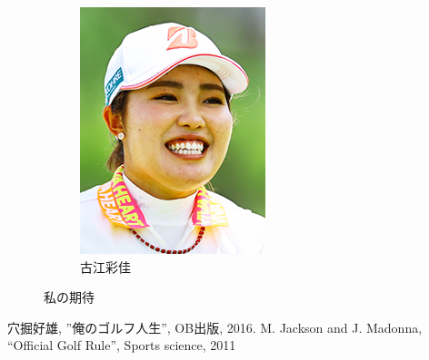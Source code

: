 \documentclass[a4j, twocolumn]{jarticle}
\begin{document}
\begin{figure}[htb]
\begin{subfigure}{0.20\linewidth}
      \includegraphics[width=\linewidth]{furue.jpg}
      \caption{古江彩佳}\label{furue}
    \end{subfigure}
    \caption{私の期待}\label{kitai}
\end{figure}

\vspace{-2em}

\begin{thebibliography}{99}
   穴掘好雄, ''俺のゴルフ人生'', OB出版, 2016.
   M. Jackson and J. Madonna, ``Official Golf Rule'', Sports science, 2011 
\end{thebibliography}
\end{document}
